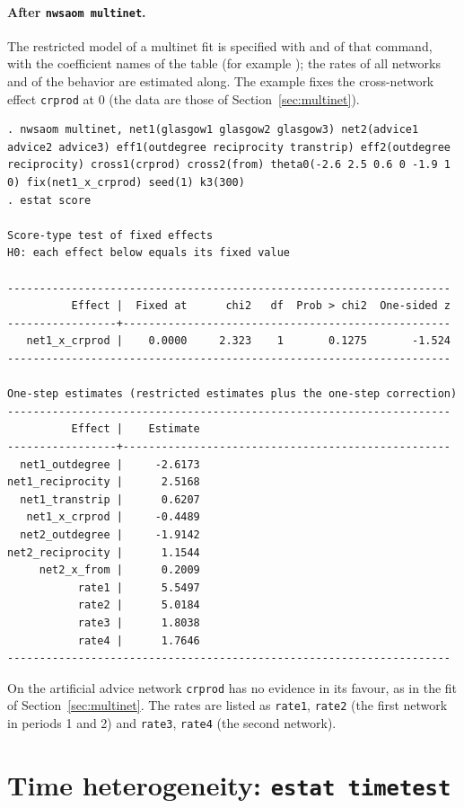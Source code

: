 \paragraph{After \texttt{nwsaom multinet}.} The restricted model of a multinet fit is specified with  and  of that command, with the coefficient names of the table (for example ); the rates of all networks and of the behavior are estimated along. The example fixes the cross-network effect \texttt{crprod} at 0 (the data are those of Section~\ref{sec:multinet}).
\begin{lstlisting}
. nwsaom multinet, net1(glasgow1 glasgow2 glasgow3) net2(advice1 advice2 advice3) eff1(outdegree reciprocity transtrip) eff2(outdegree reciprocity) cross1(crprod) cross2(from) theta0(-2.6 2.5 0.6 0 -1.9 1 0) fix(net1_x_crprod) seed(1) k3(300)
. estat score

Score-type test of fixed effects
H0: each effect below equals its fixed value

---------------------------------------------------------------------
          Effect |  Fixed at      chi2   df  Prob > chi2  One-sided z
-----------------+---------------------------------------------------
   net1_x_crprod |    0.0000     2.323    1       0.1275       -1.524
---------------------------------------------------------------------

One-step estimates (restricted estimates plus the one-step correction)
---------------------------------------------------------------------
          Effect |    Estimate
-----------------+---------------------------------------------------
  net1_outdegree |     -2.6173
net1_reciprocity |      2.5168
  net1_transtrip |      0.6207
   net1_x_crprod |     -0.4489
  net2_outdegree |     -1.9142
net2_reciprocity |      1.1544
     net2_x_from |      0.2009
           rate1 |      5.5497
           rate2 |      5.0184
           rate3 |      1.8038
           rate4 |      1.7646
---------------------------------------------------------------------
\end{lstlisting}
On the artificial advice network \texttt{crprod} has no evidence in its favour, as in the fit of Section~\ref{sec:multinet}. The rates are listed as \texttt{rate1}, \texttt{rate2} (the first network in periods 1 and 2) and \texttt{rate3}, \texttt{rate4} (the second network).

\section{Time heterogeneity: \texttt{estat timetest}}

